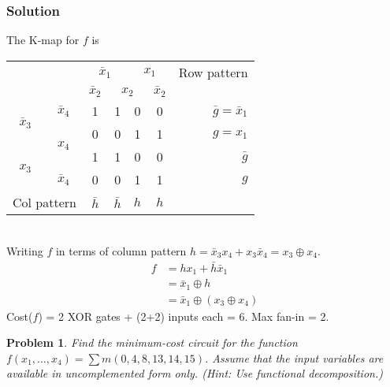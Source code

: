 \documentclass[twocolumn]{article}
\newtheorem{prob}{Problem}
\newcommand{\bx}{\bar{x}}
\begin{document}
\subsubsection*{Solution}
The K-map for $f$ is
\\[1em]
\begin{tabular}{cc|cccc|r}
  \toprule
  && \multicolumn{2}{c|}{$\bx_1$} & \multicolumn{2}{c|}{$x_1$} & Row pattern
  \\
  && $\bx_2$ & \multicolumn{2}{|c|}{$x_2$} & $\bx_2$
  \\ \midrule
  \multirow{2}{*}{$\bx_3$} & $\bx_4$
                                  & 1 & 1 & 0 & 0 & $\bar{g} = \bx_1$
  \\\cmidrule{2-2}
  & \multirow{2}{*}{$x_4$}
                                  & 0 & 0 & 1 & 1 & $g = x_1$
  \\\cmidrule{1-1}
  \multirow{2}{*}{$x_3$}   &
                                  & 1 & 1 & 0 & 0 & $\bar{g}$
  \\\cmidrule{2-2}
  & $\bx_4$
                                  & 0 & 0 & 1 & 1 & $g$
  \\\midrule
  \multicolumn{2}{l|}{Col pattern} & $\bar{h}$ & $\bar{h}$ &  $h$ & $h$ & 
  \\\bottomrule
\end{tabular}
\\[1em]
Writing $f$ in terms of column pattern $h=\bx_3 x_4 + x_3\bx_4 = x_3 \oplus x_4$.
\begin{align}
  f &= h x_1 + \bar{h} \bx_1
  \\
  &= \bx_1 \oplus h
  \\
  &= \bx_1 \oplus (x_3 \oplus x_4)
\end{align}
Cost($f$) = 2 XOR gates + (2+2) inputs each = 6.
Max fan-in = 2.




\begin{prob}
  Find the minimum-cost circuit for the function $f (x_1 , \dots, x_4 ) = \sum m(0, 4, 8, 13, 14, 15)$.
  Assume that the input variables are available in uncomplemented form only. (Hint: Use
  functional decomposition.)
\end{prob}
\end{document}
